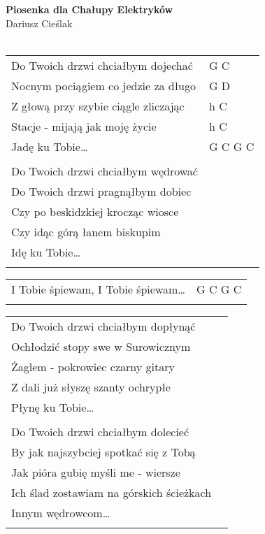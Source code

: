 \documentclass[a5paper]{article}
\begin{document}


\noindent
\fontsize{12pt}{15pt}\selectfont
\textbf{Piosenka dla Chałupy Elektryków} \\
\fontsize{8pt}{10pt}\selectfont
Dariusz Cieślak \\ \\
\fontsize{10pt}{12pt}\selectfont
{}
\begin{tabular}{@{}p{8.00cm}p{3cm}@{}}
\noindent
Do Twoich drzwi chciałbym dojechać & G C \\
Nocnym pociągiem co jedzie za długo & G D \\
Z głową przy szybie ciągle zliczając & h C \\
Stacje - mijają jak moję życie & h C \\
Jadę ku Tobie… & G C G C \\ \\

Do Twoich drzwi chciałbym wędrować \\
Do Twoich drzwi pragnąłbym dobiec \\
Czy po beskidzkiej krocząc wiosce \\
Czy idąc górą łanem biskupim \\
Idę ku Tobie… \\ \\
\end{tabular}

\noindent
\begin{tabular}{@{}p{7.00cm}p{3cm}@{}}
I Tobie śpiewam, I Tobie śpiewam… & G C G C \\ \\
\end{tabular}

\noindent
\begin{tabular}{@{}p{7.00cm}p{3cm}@{}}
Do Twoich drzwi chciałbym dopłynąć\\
Ochłodzić stopy swe w Surowicznym\\
Żaglem - pokrowiec czarny gitary\\
Z dali już słyszę szanty ochrypłe\\
Płynę ku Tobie… \\ \\

Do Twoich drzwi chciałbym dolecieć \\
By jak najszybciej spotkać się z Tobą \\
Jak pióra gubię myśli me - wiersze \\
Ich ślad zostawiam na górskich ścieżkach \\
Innym wędrowcom… \\ \\
\end{tabular}
\end{document}
